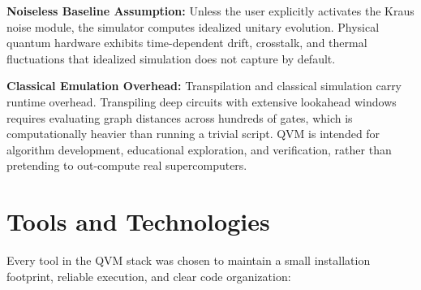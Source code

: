 \textbf{Noiseless Baseline Assumption:} Unless the user explicitly activates the Kraus noise module, the simulator computes idealized unitary evolution. Physical quantum hardware exhibits time-dependent drift, crosstalk, and thermal fluctuations that idealized simulation does not capture by default.

\textbf{Classical Emulation Overhead:} Transpilation and classical simulation carry runtime overhead. Transpiling deep circuits with extensive lookahead windows requires evaluating graph distances across hundreds of gates, which is computationally heavier than running a trivial script. QVM is intended for algorithm development, educational exploration, and verification, rather than pretending to out-compute real supercomputers.


\section{Tools and Technologies}

Every tool in the QVM stack was chosen to maintain a small installation footprint, reliable execution, and clear code organization:

